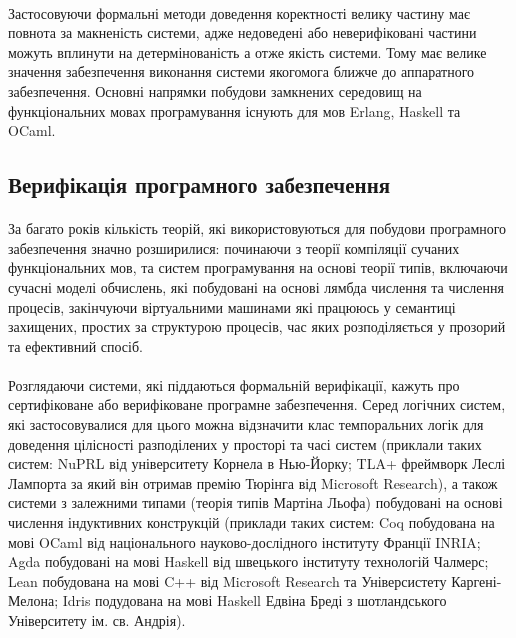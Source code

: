 \documentclass[11pt,oneside]{article}
\begin{document}
   \paragraph{}
   Застосовуючи формальні методи доведення коректності велику частину має повнота за макненість системи,
   адже недоведені або неверифіковані частини можуть вплинути на детермінованість а отже якість системи.
   Тому має велике значення забезпечення виконання системи якогомога ближче до аппаратного забезпечення.
   Основні напрямки побудови замкнених середовищ на функціональних мовах програмування існують для мов Erlang, Haskell та OCaml.

\newpage
\subsection{Верифікація програмного забезпечення}

   \paragraph{}
   За багато років кількість теорій, які використовуються для побудови програмного забезпечення значно розширилися:
   починаючи з теорії компіляції сучаних функціональних мов, та систем програмування на основі теорії типів,
   включаючи сучасні моделі обчислень, які побудовані на основі лямбда числення та числення процесів, закінчуючи віртуальними
   машинами які працююсь у семантиці захищених, простих за структурою процесів, час яких розподіляється
   у прозорий та ефективний спосіб.

   \paragraph{}
   Розглядаючи системи, які піддаються формальній верифікації, кажуть про
   сертифіковане або верифіковане програмне забезпечення. Серед логічних систем, які
   застосовувалися для цього можна відзначити клас темпоральних логік для доведення
   цілісності разподілених у просторі та часі систем (приклали таких систем: NuPRL від університету Корнела в Нью-Йорку;
   TLA+ фреймворк Леслі Лампорта за який він отримав премію Тюрінга від Microsoft Research), а також системи з залежними
   типами (теорія типів Мартіна Льофа) побудовані на основі числення індуктивних конструкцій (приклади таких систем:
   Coq побудована на мові OCaml від національного науково-дослідного інституту Франції INRIA;
   Agda побудовані на мові Haskell від швецького інституту технологій Чалмерс;
   Lean побудована на мові C++ від Microsoft Research та Універсистету Каргені-Мелона;
   Idris подудована на мові Haskell Едвіна Бреді з шотландського Університету ім. св. Андрія).
\end{document}
